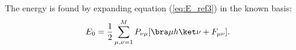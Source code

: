 The energy is found by expanding equation (\ref{eq:E_ref3}) in the known basis:
\begin{equation}
 \label{eq:E_ref4}
 E_0 = \frac{1}{2}\sum_{\mu,\nu=1}^M P_{\nu\mu}[\bra\mu h \ket\nu + F_{\mu\nu}].
\end{equation}









